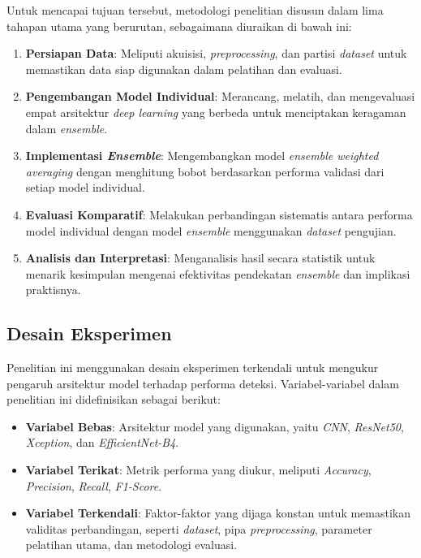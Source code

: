 Untuk mencapai tujuan tersebut, metodologi penelitian disusun dalam lima tahapan utama yang berurutan, sebagaimana diuraikan di bawah ini:
\begin{enumerate}
    \item \textbf{Persiapan Data}: Meliputi akuisisi, \textit{preprocessing}, dan partisi \textit{dataset} untuk memastikan data siap digunakan dalam pelatihan dan evaluasi.
    \item \textbf{Pengembangan Model Individual}: Merancang, melatih, dan mengevaluasi empat arsitektur \textit{deep learning} yang berbeda untuk menciptakan keragaman dalam \textit{ensemble}.
    \item \textbf{Implementasi \textit{Ensemble}}: Mengembangkan model \textit{ensemble weighted averaging} dengan menghitung bobot berdasarkan performa validasi dari setiap model individual.
    \item \textbf{Evaluasi Komparatif}: Melakukan perbandingan sistematis antara performa model individual dengan model \textit{ensemble} menggunakan \textit{dataset} pengujian.
    \item \textbf{Analisis dan Interpretasi}: Menganalisis hasil secara statistik untuk menarik kesimpulan mengenai efektivitas pendekatan \textit{ensemble} dan implikasi praktisnya.
\end{enumerate}

\subsection{Desain Eksperimen}

Penelitian ini menggunakan desain eksperimen terkendali untuk mengukur pengaruh arsitektur model terhadap performa deteksi. Variabel-variabel dalam penelitian ini didefinisikan sebagai berikut:
\begin{itemize}
    \item \textbf{Variabel Bebas}: Arsitektur model yang digunakan, yaitu \textit{CNN}, \textit{ResNet50}, \textit{Xception}, dan \textit{EfficientNet-B4}.
    \item \textbf{Variabel Terikat}: Metrik performa yang diukur, meliputi \textit{Accuracy}, \textit{Precision}, \textit{Recall}, \textit{F1-Score}.
    \item \textbf{Variabel Terkendali}: Faktor-faktor yang dijaga konstan untuk memastikan validitas perbandingan, seperti \textit{dataset}, pipa \textit{preprocessing}, parameter pelatihan utama, dan metodologi evaluasi.
\end{itemize}

